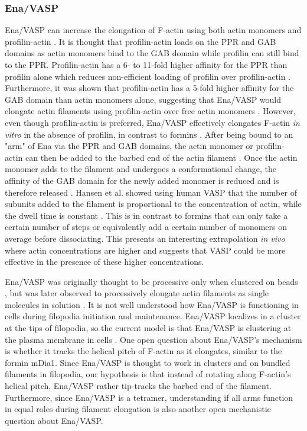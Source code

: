 \subsubsection{Ena/VASP}
Ena/VASP can increase the elongation of F-actin using both actin monomers and profilin-actin \citep{kang_profilin_1997,hansen_vasp_2010, winkelman_ena/vasp_2014}. It is thought that profilin-actin loads on the PPR and GAB domains as actin monomers bind to the GAB domain while profilin can still bind to the PPR. Profilin-actin has a 6- to 11-fold higher affinity for the PPR than profilin alone which reduces non-efficient loading of profilin over profilin-actin \citep{ferron_structural_2007}. Furthermore, it was shown that profilin-actin has a 5-fold higher affinity for the GAB domain than actin monomers alone, suggesting that Ena/VASP would elongate actin filaments using profilin-actin over free actin monomers \citep{chereau_understanding_2006}. However, even though profilin-actin is preferred, Ena/VASP effectively elongates F-actin \textit{in vitro} in the absence of profilin, in contrast to formins \citep{hansen_vasp_2010,winkelman_ena/vasp_2014}. After being bound to an "arm" of Ena via the PPR and GAB domains, the actin monomer or profilin-actin can then be added to the barbed end of the actin filament \citep{chereau_understanding_2006, ferron_structural_2007, breitsprecher_molecular_2011}. Once the actin monomer adds to the filament and undergoes a conformational change, the affinity of the GAB domain for the newly added monomer is reduced and is therefore released \citep{chereau_understanding_2006}. Hansen et al. showed using human VASP that the number of subunits added to the filament is proportional to the concentration of actin, while the dwell time is constant \citep{hansen_vasp_2010}. This is in contrast to formins that can only take a certain number of steps or equivalently add a certain number of monomers on average before dissociating. This presents an interesting extrapolation \textit{in vivo} where actin concentrations are higher and suggests that VASP could be more effective in the presence of these higher concentrations.  

Ena/VASP was originally thought to be processive only when clustered on beads \citep{breitsprecher_clustering_2008}, but was later observed to processively elongate actin filaments as single molecules in solution \citep{hansen_vasp_2010,winkelman_ena/vasp_2014, breitsprecher_molecular_2011}. It is not well understood how Ena/VASP is functioning in cells during filopodia initiation and maintenance. Ena/VASP localizes in a cluster at the tips of filopodia, so the current model is that Ena/VASP is clustering at the plasma membrane in cells \citep{svitkina_mechanism_2003,lanier_mena_1999}. One open question about Ena/VASP's mechanism is whether it tracks the helical pitch of F-actin as it elongates, similar to the formin mDia1. Since Ena/VASP is thought to work in clusters and on bundled filaments in filopodia, our hypothesis is that instead of rotating along F-actin's helical pitch, Ena/VASP rather tip-tracks the barbed end of the filament. Furthermore, since Ena/VASP is a tetramer, understanding if all arms function in equal roles during filament elongation is also another open mechanistic question about Ena/VASP. 


